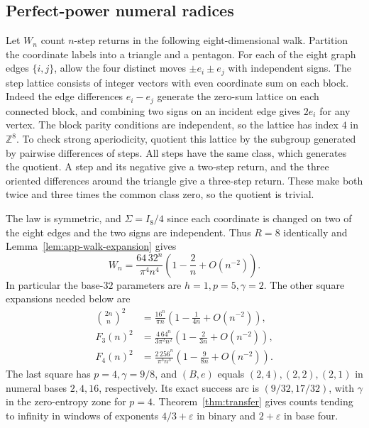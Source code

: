 \documentclass[11pt,reqno,a4paper]{amsart}
\theoremstyle{remark}
\begin{document}
\subsection{Perfect-power numeral radices}

Let \(W_n\) count \(n\)-step returns in the following
eight-dimensional walk. Partition the coordinate labels into a
triangle and a pentagon. For each of the eight graph edges
\(\{i,j\}\), allow the four distinct moves \(\pm e_i\pm e_j\)
with independent signs. The step lattice consists of integer
vectors with even coordinate sum on each block. Indeed the edge
differences \(e_i-e_j\) generate the zero-sum lattice on each
connected block, and combining two signs on an incident edge
gives \(2e_i\) for any vertex. The block parity conditions are
independent, so the lattice has index \(4\) in \(\mathbb Z^8\).
To check strong aperiodicity, quotient this lattice by the subgroup
generated by pairwise differences of steps. All steps have the
same class, which generates the quotient. A step and its negative
give a two-step return, and the three oriented differences around
the triangle give a three-step return. These make both twice and
three times the common class zero, so the quotient is trivial.

The law is symmetric, and \(\Sigma=I_8/4\) since each coordinate is
changed on two of the eight edges and the two signs are
independent. Thus \(R=8\) identically and
Lemma~\ref{lem:app-walk-expansion} gives
\begin{equation}\label{eq:app-32walk}
 W_n=\frac{64\,32^n}{\pi^4 n^4}
       \left(1-\frac2n+O(n^{-2})\right).
\end{equation}
In particular the base-\(32\) parameters are \(h=1,p=5,\gamma=2\).
The other square expansions needed below are
\begin{align*}
 \binom{2n}{n}^2&=\frac{16^n}{\pi n}
                  \left(1-\frac1{4n}+O(n^{-2})\right),\\
 F_3(n)^2&=\frac{4\,64^n}{3\pi^2 n^2}
                  \left(1-\frac2{3n}+O(n^{-2})\right),\\
 F_4(n)^2&=\frac{2\,256^n}{\pi^3 n^3}
                  \left(1-\frac9{8n}+O(n^{-2})\right).
\end{align*}
The last square has \(p=4,\gamma=9/8\), and \((B,e)\) equals
\((2,4),(2,2),(2,1)\) in numeral bases \(2,4,16\), respectively.
Its exact success arc is \((9/32,17/32)\), with
\(\gamma\) in the zero-entropy zone for \(p=4\). Theorem~\ref{thm:transfer}
gives counts tending to infinity in windows of exponents
\(4/3+\varepsilon\) in binary and \(2+\varepsilon\) in base four.
\end{document}
